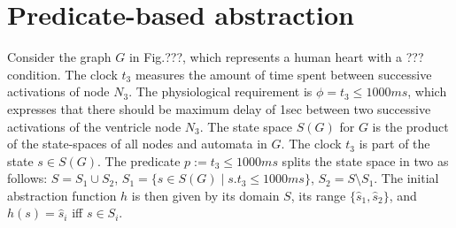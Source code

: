 \section{Predicate-based abstraction}
\label{predicateBasedAbstraction}
\begin{exmp}
	Consider the graph $G$ in Fig.???, which represents a human heart with a ??? condition.
	The clock $t_3$ measures the amount of time spent between successive activations of node $N_3$.
	The physiological requirement is $\phi = t_3 \leq 1000ms$, which expresses that there should be maximum delay of 1sec between two successive activations of the ventricle node $N_3$.
	The state space $S(G)$ for $G$ is the product of the state-spaces of all nodes and automata in $G$. 
	The clock $t_3$ is part of the state $s \in S(G)$.
	The predicate $p := t_3 \leq 1000ms$ splits the state space in two as follows:
	$S = S_1 \cup S_2$, $S_1 = \{s \in S(G) \;|\; s.t_3 \leq 1000ms\}$, $S_2 = S \setminus S_1$.
	The initial abstraction function $h$ is then given by its domain $S$, its range $\{\hat{s}_1, \hat{s}_2\}$, and $h(s) = \hat{s}_i$ iff $s \in S_i$.	
	
\end{exmp}